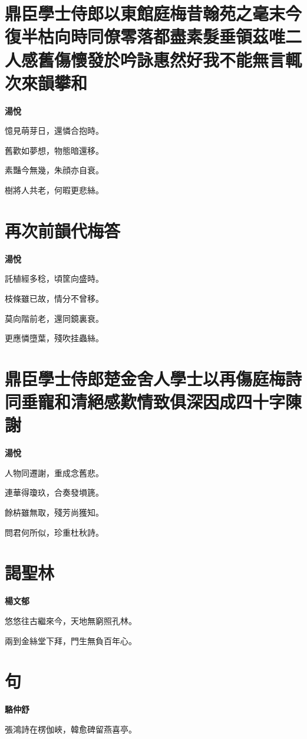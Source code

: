 \documentclass[12pt,a4paper]{ctexbook}
\begin{document}
\section{鼎臣學士侍郎以東館庭梅昔翰苑之毫末今復半枯向時同僚零落都盡素髮垂領茲唯二人感舊傷懷發於吟詠惠然好我不能無言輒次來韻攀和}
\textbf{湯悅}\par\vspace{0.5em}
憶見萌芽日，還憐合抱時。\par
舊歡如夢想，物態暗還移。\par
素豔今無幾，朱顔亦自衰。\par
樹將人共老，何暇更悲絲。\par

\section{再次前韻代梅答}
\textbf{湯悅}\par\vspace{0.5em}
託植經多稔，頃筐向盛時。\par
枝條雖已故，情分不曾移。\par
莫向階前老，還同鏡裏衰。\par
更應憐墮葉，殘吹挂蟲絲。\par

\section{鼎臣學士侍郎楚金舍人學士以再傷庭梅詩同垂寵和清絕感歎情致俱深因成四十字陳謝}
\textbf{湯悅}\par\vspace{0.5em}
人物同遷謝，重成念舊悲。\par
連華得瓊玖，合奏發塤篪。\par
餘枿雖無取，殘芳尚獲知。\par
問君何所似，珍重杜秋詩。\par

\section{謁聖林}
\textbf{楊文郁}\par\vspace{0.5em}
悠悠往古繼來今，天地無窮照孔林。\par
兩到金絲堂下拜，門生無負百年心。\par

\section{句}
\textbf{駱仲舒}\par\vspace{0.5em}
張鴻詩在楞伽峽，韓愈碑留燕喜亭。\par
\end{document}

